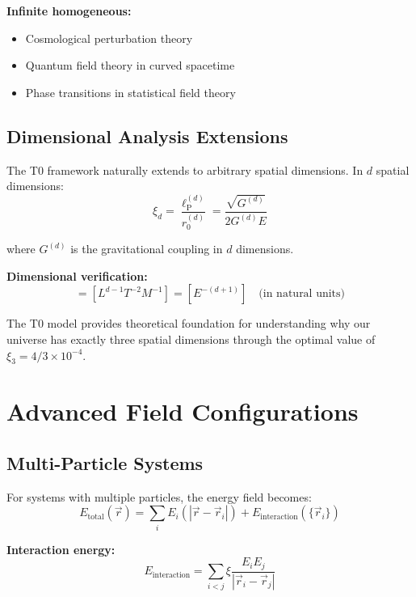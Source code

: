 \documentclass[12pt,a4paper]{report}
\newcommand{\lP}{\ell_{\text{P}}}         %
\begin{document}
\textbf{Infinite homogeneous:}
\begin{itemize}
	\item Cosmological perturbation theory
	\item Quantum field theory in curved spacetime
	\item Phase transitions in statistical field theory
\end{itemize}

\subsection{Dimensional Analysis Extensions}
\label{subsec:dimensional_analysis}

The T0 framework naturally extends to arbitrary spatial dimensions. In $d$ spatial dimensions:
\begin{equation}
	\xi_d = \frac{\lP^{(d)}}{r_0^{(d)}} = \frac{\sqrt{G^{(d)}}}{2G^{(d)}E}
\end{equation}

where $G^{(d)}$ is the gravitational coupling in $d$ dimensions.

\textbf{Dimensional verification:}
\begin{equation}
	[G^{(d)}] = [L^{d-1} T^{-2} M^{-1}] = [E^{-(d+1)}] \quad \text{(in natural units)}
\end{equation}

The T0 model provides theoretical foundation for understanding why our universe has exactly three spatial dimensions through the optimal value of $\xi_3 = 4/3 \times 10^{-4}$.

\section{Advanced Field Configurations}
\label{sec:advanced_configurations}

\subsection{Multi-Particle Systems}
\label{subsec:multi_particle_systems}

For systems with multiple particles, the energy field becomes:
\begin{equation}
	E_{\text{total}}(\vec{r}) = \sum_i E_i(|\vec{r} - \vec{r}_i|) + E_{\text{interaction}}(\{\vec{r}_i\})
\end{equation}

\textbf{Interaction energy:}
\begin{equation}
	E_{\text{interaction}} = \sum_{i<j} \xi \frac{E_i E_j}{|\vec{r}_i - \vec{r}_j|}
\end{equation}
\end{document}
